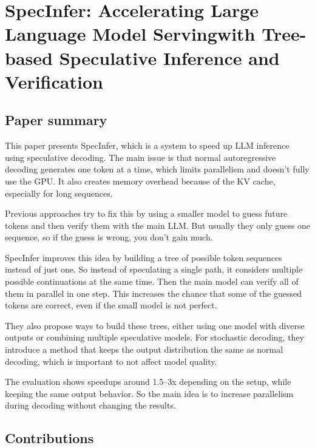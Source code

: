 \documentclass[a4paper, 12pt]{article}
\begin{document}
\section*{SpecInfer: Accelerating Large Language Model Servingwith
Tree-based Speculative Inference and Verification}
\subsection{Paper summary}

This paper presents SpecInfer, which is a system to speed up LLM inference using speculative decoding. The main issue is that normal autoregressive decoding generates one token at a time, which limits parallelism and doesn’t fully use the GPU. It also creates memory overhead because of the KV cache, especially for long sequences.

Previous approaches try to fix this by using a smaller model to guess future tokens and then verify them with the main LLM. But usually they only guess one sequence, so if the guess is wrong, you don’t gain much.

SpecInfer improves this idea by building a tree of possible token sequences instead of just one. So instead of speculating a single path, it considers multiple possible continuations at the same time. Then the main model can verify all of them in parallel in one step. This increases the chance that some of the guessed tokens are correct, even if the small model is not perfect.

They also propose ways to build these trees, either using one model with diverse outputs or combining multiple speculative models. For stochastic decoding, they introduce a method that keeps the output distribution the same as normal decoding, which is important to not affect model quality.

The evaluation shows speedups around 1.5--3x depending on the setup, while keeping the same output behavior. So the main idea is to increase parallelism during decoding without changing the results.

\subsection{Contributions}
\end{document}
